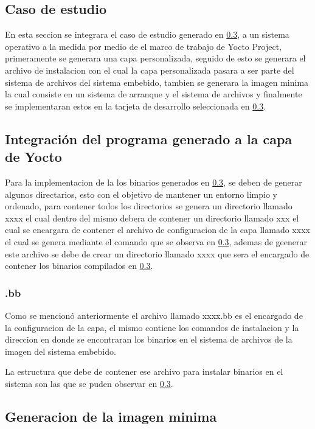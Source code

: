 \subsection{Caso de estudio}

En esta seccion se integrara el caso de estudio generado en \ref{}, a un sistema operativo a la medida por medio de el marco de trabajo de Yocto Project, primeramente se generara una capa personalizada, seguido de esto se generara el archivo de instalacion con el cual la capa personalizada pasara a ser parte del sistema de archivos del sistema embebido, tambien se generara la imagen minima la cual consiste en un sistema de arranque y el sistema de archivos y finalmente se implementaran estos en la tarjeta de desarrollo seleccionada en \ref{}.

\subsection{Integración del programa generado a la capa de Yocto}

Para la implementacion de la los binarios generados en \ref{}, se deben de generar algunos directarios, esto con el objetivo de mantener un entorno limpio y ordenado, para contener todos los directorios se genera un directorio llamado xxxx el cual dentro del mismo debera de contener un directorio llamado xxx el cual se encargara de contener el archivo de configuracion de la capa llamado xxxx el cual se genera mediante el comando que se observa en \ref{}, ademas de geenerar este archivo se debe de crear un directorio llamado xxxx que sera el encargado de contener los binarios compilados en \ref{}.

\subsubsection{.bb}

Como se mencionó anteriormente el archivo llamado xxxx.bb es el encargado de la configuracion de la capa, el mismo contiene los comandos de instalacion y la direccion en donde se encontraran los binarios en el sistema de archivos de la imagen del sistema embebido.

La estructura que debe de contener ese archivo para instalar binarios en el sistema son las que se puden observar en \ref{}.

\subsection{Generacion de la imagen minima}

